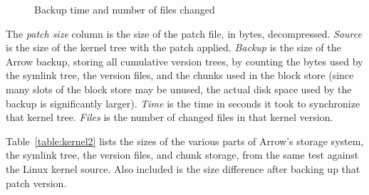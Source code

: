 \documentclass{article}
\begin{document}
\begin{figure}[ht!]
  \begin{center}
    \caption{Backup time and number of files changed}
    \label{graph:time-files}
  \end{center}
\end{figure}

The \emph{patch size} column is the size of the patch file, in bytes,
decompressed. \emph{Source} is the size of the kernel tree with the
patch applied. \emph{Backup} is the size of the Arrow backup, storing
all cumulative version trees, by counting the bytes used by the
symlink tree, the version files, and the chunks used in the block
store (since many slots of the block store may be unused, the actual
disk space used by the backup is significantly larger). \emph{Time} is
the time in seconds it took to synchronize that kernel tree.
\emph{Files} is the number of changed files in that kernel version.

Table~\ref{table:kernel2} lists the sizes of the various parts of
Arrow's storage system, the symlink tree, the version files, and chunk
storage, from the same test against the Linux kernel source. Also
included is the size difference after backing up that patch version.
\end{document}
